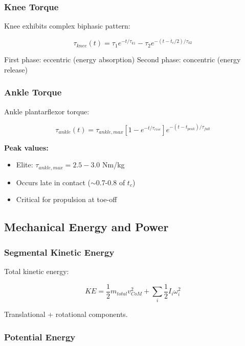 \subsubsection{Knee Torque}

Knee exhibits complex biphasic pattern:

\begin{equation}
\tau_{knee}(t) = \tau_1 e^{-t/\tau_{k1}} - \tau_2 e^{-(t-t_c/2)/\tau_{k2}}
\label{eq:knee_torque}
\end{equation}

First phase: eccentric (energy absorption)
Second phase: concentric (energy release)

\subsubsection{Ankle Torque}

Ankle plantarflexor torque:

\begin{equation}
\tau_{ankle}(t) = \tau_{ankle,max} \left[1 - e^{-t/\tau_{rise}}\right] e^{-(t-t_{peak})/\tau_{fall}}
\label{eq:ankle_torque}
\end{equation}

\textbf{Peak values:}
\begin{itemize}
\item Elite: $\tau_{ankle,max} = 2.5-3.0$ Nm/kg
\item Occurs late in contact ($\sim$0.7-0.8 of $t_c$)
\item Critical for propulsion at toe-off
\end{itemize}

\subsection{Mechanical Energy and Power}

\subsubsection{Segmental Kinetic Energy}

Total kinetic energy:

\begin{equation}
KE = \frac{1}{2} m_{total} v_{CoM}^2 + \sum_{i} \frac{1}{2} I_i \omega_i^2
\label{eq:kinetic_energy}
\end{equation}

Translational + rotational components.

\subsubsection{Potential Energy}

